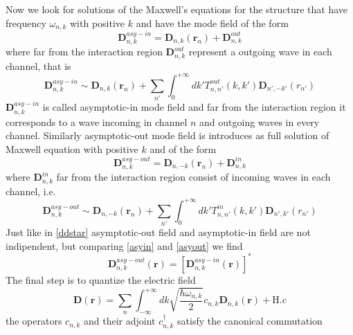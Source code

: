 \documentclass[12pt]{book}
\renewcommand{\r}{\mathbf{r}}
\begin{document}
Now we look for solutions of the Maxwell's equations for the structure that have frequency $\omega_{n,k}$ with positive $k$ and have the mode field of the form
\begin{equation}\mathbf{D}^{asy-in}_{n,k} =\mathbf{D}_{n,k}(\r_n) + \mathbf{D}^{out}_{n,k}\end{equation}
where far from the interaction region $\mathbf{D}^{out}_{n,k}$ represent a outgoing wave in each channel, that is
\begin{equation}\label{asyin}\mathbf{D}^{asy-in}_{n,k} \sim \mathbf{D}_{n,k}(\r_n) + \sum_{n'}\int_{0}^{+\infty}dk' T^{out}_{n,n'}(k,k')\mathbf{D}_{n',-k'}(r_{n'})\end{equation}
$\mathbf{D}^{asy-in}_{n,k}$ is called asymptotic-in mode field and far from the interaction region it corresponds to a wave incoming in channel $n$ and outgoing waves in every channel. %
Similarly asymptotic-out mode field is introduces as full solution of Maxwell equation with positive $k$ and of the form
\begin{equation}\mathbf{D}^{asy-out}_{n,k} =\mathbf{D}_{n,-k}(\r_n) + \mathbf{D}^{in}_{n,k}\end{equation}
where $\mathbf{D}^{in}_{n,k}$ far from the interaction region consist of incoming waves in each channel, i.e.
\begin{equation}\label{asyout}\mathbf{D}^{asy-out}_{n,k} \sim \mathbf{D}_{n,-k}(\r_n) + \sum_{n'}\int_{0}^{+\infty}dk' T^{in}_{n,n'}(k,k')\mathbf{D}_{n',k'}(r_{n'})\end{equation} 
Just like in \eqref{ddstar} asymptotic-out field and asymptotic-in field are not indipendent, but comparing \eqref{asyin} and \eqref{asyout} we find
\begin{equation}\mathbf{D}^{asy-out}_{n,k}(\r) = [\mathbf{D}^{asy-in}_{n,k}(\r)]^*\end{equation}
The final step is to quantize the electric field 
\begin{equation}\mathbf{D}(\r) = \sum_n \int_{-\infty}^{+\infty}dk \sqrt{\frac{\hbar \omega_{n,k}}{2}}c_{n,k}\mathbf{D}_{n,k}(\r) + \text{H.c}\end{equation}
the operators $c_{n,k}$ and their adjoint $c_{n,k}^\dagger$ satisfy the canonical commutation
\end{document}
